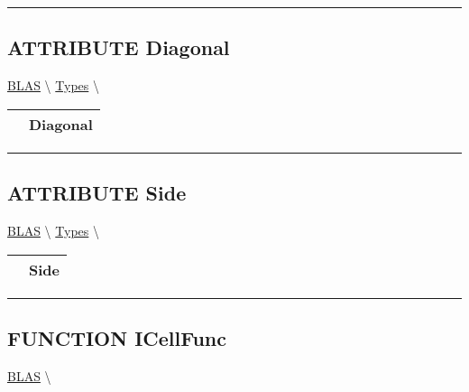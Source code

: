\par


\rule{\linewidth}{0.5pt}
\subsection*{\textsf{\colorbox{headtoc}{\color{white} ATTRIBUTE}
Diagonal}}

\hypertarget{ecldoc:ecldoc-Diagonal}{}
\hspace{0pt} \hyperlink{ecldoc:BLAS}{BLAS} \textbackslash 
\hspace{0pt} \hyperlink{ecldoc:BLAS.Types}{Types} \textbackslash 

{\renewcommand{\arraystretch}{1.5}
\begin{tabularx}{\textwidth}{|>{\raggedright\arraybackslash}l|X|}
\hline
\hspace{0pt}\mytexttt{\color{red} } & \textbf{Diagonal} \\
\hline
\end{tabularx}
}

\par


\rule{\linewidth}{0.5pt}
\subsection*{\textsf{\colorbox{headtoc}{\color{white} ATTRIBUTE}
Side}}

\hypertarget{ecldoc:ecldoc-Side}{}
\hspace{0pt} \hyperlink{ecldoc:BLAS}{BLAS} \textbackslash 
\hspace{0pt} \hyperlink{ecldoc:BLAS.Types}{Types} \textbackslash 

{\renewcommand{\arraystretch}{1.5}
\begin{tabularx}{\textwidth}{|>{\raggedright\arraybackslash}l|X|}
\hline
\hspace{0pt}\mytexttt{\color{red} } & \textbf{Side} \\
\hline
\end{tabularx}
}

\par


\rule{\linewidth}{0.5pt}


\subsection*{\textsf{\colorbox{headtoc}{\color{white} FUNCTION}
ICellFunc}}

\hypertarget{ecldoc:blas.icellfunc}{}
\hspace{0pt} \hyperlink{ecldoc:BLAS}{BLAS} \textbackslash 

